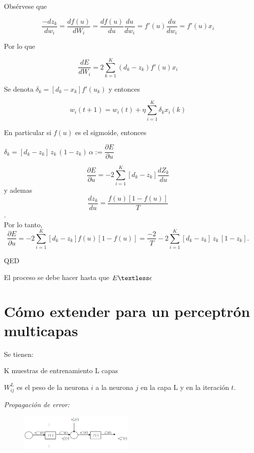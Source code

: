 Obsérvese que

$$\dfrac{-dz_k}{dw_i} = \dfrac{df(u)}{dW_i} = \dfrac{df(u)}{du} \dfrac{du}{dw_i} = f'(u) \dfrac{du}{dw_i} = f'(u) x_i
$$

Por lo que

$$
\dfrac{dE}{dW_i} = 2 \sum_{k=1}^{K} (d_k - z_k) f'(u) x_i
$$

Se denota $\delta_k = [d_k - x_k] f'(u_k)$ y entonces

\begin{scaja}
	$$ w_i(t + 1) = w_i(t) + \eta \sum_{i=1}^{K} \delta_k x_i (k) $$
\end{scaja}

En particular si $f(u)$ es el sigmoide, entonces

$\delta_k=[d_k - z_k] \, z_k \,  (1-z_k)\, \alpha := \dfrac{\partial E}{\partial u}
$

\begin{scaja}
	$$ \dfrac{\partial E}{\partial u} = -2 \sum_{i=1}^{K} [d_k - z_k] \dfrac{dZ_k}{du} $$ y ademas $$\dfrac{dz_k}{du}= \dfrac{f(u)[1 - f(u)]}{T}
	$$.   \\  Por lo tanto, 
	$$
	\dfrac{\partial E}{\partial u} = -2 \sum_{i=1}^{K} [d_k - z_k] f(u) [1 - f(u)] = \dfrac{-2}{T} -2 \sum_{i=1}^{K} [d_k - z_k] \, z_k \, [1-z_k]. 
	$$
\begin{center}
	QED
\end{center}	
\end{scaja}

El proceso se debe hacer hasta que $E\textless \epsilon$


\section{Cómo extender para un perceptrón multicapas}

Se tienen:

K muestras de entrenamiento
L capas

$W_{ij}^L$ es el peso de la neurona $i$ a la neurona $j$ en la capa L y en la iteración $t$.

\textit{Propagación de error:}

\begin{figure}[h!]
	\centering
	\includegraphics[width=0.5\textwidth]{images/img78.png}
	\label{figura78}
\end{figure}


